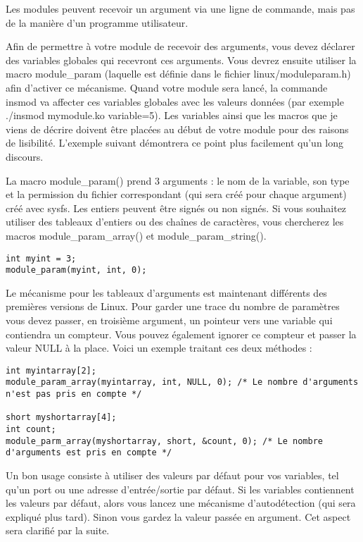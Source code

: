 \documentclass[11pt]{article}
\begin{document}
Les modules peuvent recevoir un argument via une ligne de commande, mais pas de la manière d'un programme utilisateur.

Afin de permettre à votre module de recevoir des arguments, vous devez déclarer des variables globales qui recevront ces arguments. Vous devrez ensuite utiliser la macro module\_param (laquelle est définie dans le fichier linux/moduleparam.h) afin d'activer ce mécanisme. Quand votre module sera lancé, la commande insmod va affecter ces variables globales avec les valeurs données (par exemple ./insmod mymodule.ko variable=5). Les variables ainsi que les macros que je viens de décrire doivent être placées au début de votre module pour des raisons de lisibilité. L'exemple suivant démontrera ce point plus facilement qu'un long discours.

La macro module\_param() prend 3 arguments : le nom de la variable, son type et la permission du fichier correspondant (qui sera créé pour chaque argument) créé avec sysfs. Les entiers peuvent être signés ou non signés. Si vous souhaitez utiliser des tableaux d'entiers ou des chaînes de caractères, vous chercherez les macros module\_param\_array() et module\_param\_string().

\begin{verbatim}
int myint = 3;
module_param(myint, int, 0);
\end{verbatim}

Le mécanisme pour les tableaux d'arguments est maintenant différents des premières versions de Linux. Pour garder une trace du nombre de paramètres vous devez passer, en troisième argument, un pointeur vers une variable qui contiendra un compteur. Vous pouvez également ignorer ce compteur et passer la valeur NULL à la place. Voici un exemple traitant ces deux méthodes :

\begin{verbatim}
int myintarray[2];
module_param_array(myintarray, int, NULL, 0); /* Le nombre d'arguments n'est pas pris en compte */

short myshortarray[4];
int count;
module_parm_array(myshortarray, short, &count, 0); /* Le nombre d'arguments est pris en compte */
\end{verbatim}

Un bon usage consiste à utiliser des valeurs par défaut pour vos variables, tel qu'un port ou une adresse d'entrée/sortie par défaut. Si les variables contiennent les valeurs par défaut, alors vous lancez une mécanisme d'autodétection (qui sera expliqué plus tard). Sinon vous gardez la valeur passée en argument. Cet aspect sera clarifié par la suite.
\end{document}
